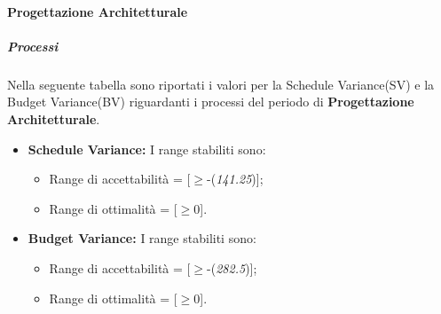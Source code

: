     \paragraph{Progettazione Architetturale}
      \subparagraph{Processi}
      Nella seguente tabella sono riportati i valori per la Schedule Variance(SV) e la Budget Variance(BV) riguardanti i processi del periodo di \textbf{Progettazione Architetturale}.\\
      \begin{itemize}
      \item \textbf{Schedule Variance:} I range stabiliti sono:
      \begin{itemize}
        \item Range di accettabilità = [\(\geq\)-(\emph{141.25})];
        \item Range di ottimalità = [\(\geq\)0].
      \end{itemize}
      
      \item \textbf{Budget Variance:} I range stabiliti sono:
      \begin{itemize}
        \item Range di accettabilità = [\(\geq\)-(\emph{282.5})];
        \item Range di ottimalità = [\(\geq\)0].
      \end{itemize}
      
      
      \end{itemize}
     
